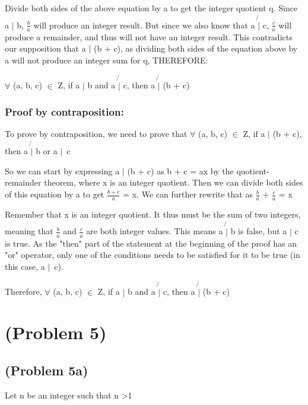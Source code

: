 \documentclass{article}
\begin{document}
\par\vspace{0.5cm}\noindent Divide both sides of the above equation by a to get the integer quotient q.  Since a $\mid$ b, $\frac{b}{a}$ will produce an integer result.  But since we also know that a $\not{|}$ c, $\frac{c}{a}$ will produce a remainder, and thus will not have an integer result.  This contradicts our supposition that a $\mid$ (b + c), as dividing both sides of the equation above by a will not produce an integer sum for q, THEREFORE:

\par\vspace{0.5cm}\noindent $\forall$ (a, b, c) $\in$ Z, if a $\mid$ b and a $\not{|}$ c, then a $\not{|}$ (b + c)

\subsubsection{Proof by contraposition:}

To prove by contraposition, we need to prove that $\forall$ (a, b, c) $\in$ Z, if a $\mid$ (b + c), then a $\not{|}$ b or a $\mid$\ c

\par\vspace{0.5cm}\noindent So we can start by expressing a $\mid$ (b + c) as b + c = ax by the quotient-remainder theorem, where x is an integer quotient.  Then we can divide both sides of this equation by a to get $\frac{b + c}{a}$ = x.  We can further rewrite that as $\frac{b}{a}$ + $\frac{c}{a}$ = x

\par\vspace{0.5cm}\noindent Remember that x is an integer quotient.  It thus must be the sum of two integers, meaning that $\frac{b}{a}$ and $\frac{c}{a}$ are both integer values.  This means a $\not{|}$ b is false, but a $\mid$ c is true.  As the "then" part of the statement at the beginning of the proof has an "or" operator, only one of the conditions needs to be satisfied for it to be true (in this case, a $\mid$\ c).
\par\vspace{0.5cm}\noindent Therefore, $\forall$ (a, b, c) $\in$ Z, if a $\mid$ b and a $\not{|}$ c, then a $\not{|}$ (b + c)

\section{(Problem 5)}
\subsection{(Problem 5a)}
Let n be an integer such that n \textgreater 1
\end{document}
